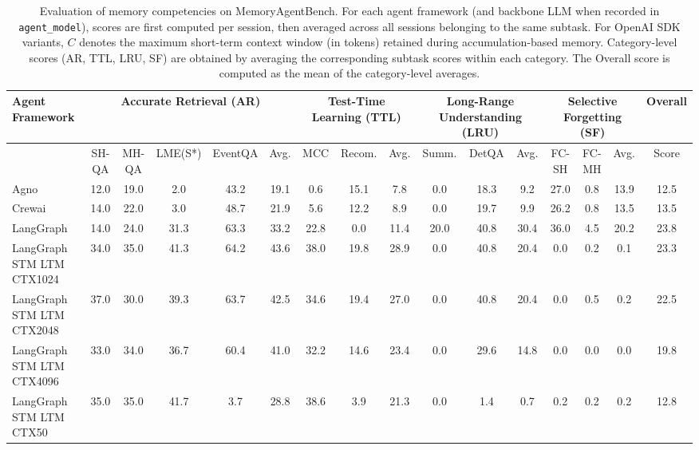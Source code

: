 \setlength{\tabcolsep}{2pt}
\begin{table}[t]
\centering
\caption{Evaluation of memory competencies on MemoryAgentBench.
For each agent framework (and backbone LLM when recorded in \texttt{agent\_model}), scores are first computed per session, then averaged across all sessions belonging to the same subtask.
For OpenAI SDK variants, $C$ denotes the maximum short-term context window (in tokens) retained during accumulation-based memory.
Category-level scores (AR, TTL, LRU, SF) are obtained by averaging the corresponding subtask scores within each category.
The Overall score is computed as the mean of the category-level averages.
}
\label{tab:memorybench-results}
\footnotesize
\begin{tabular}{
    l|
    *{5}{c}|  %
    *{3}{c}|  %
    *{3}{c}|  %
    *{3}{c}|  %
    c         %
}
\toprule
\textbf{Agent Framework} &
\multicolumn{5}{c|}{\textbf{Accurate Retrieval (AR)}} &
\multicolumn{3}{c|}{\textbf{Test-Time Learning (TTL)}} &
\multicolumn{3}{c|}{\textbf{Long-Range Understanding (LRU)}} &
\multicolumn{3}{c|}{\textbf{Selective Forgetting (SF)}} &
\textbf{Overall} \\
\midrule
& SH-QA & MH-QA & LME(S*) & EventQA & Avg. &
  MCC & Recom. & Avg. &
  Summ. & DetQA & Avg. &
  FC-SH & FC-MH & Avg. &
  Score \\
\midrule
Agno & 12.0 & 19.0 & 2.0 & 43.2 & 19.1 & 0.6 & 15.1 & 7.8 & 0.0 & 18.3 & 9.2 & 27.0 & 0.8 & 13.9 & 12.5 \\
Crewai & 14.0 & 22.0 & 3.0 & 48.7 & 21.9 & 5.6 & 12.2 & 8.9 & 0.0 & 19.7 & 9.9 & 26.2 & 0.8 & 13.5 & 13.5 \\
LangGraph & 14.0 & 24.0 & 31.3 & 63.3 & 33.2 & 22.8 & 0.0 & 11.4 & 20.0 & 40.8 & 30.4 & 36.0 & 4.5 & 20.2 & 23.8 \\
LangGraph STM LTM CTX1024 & 34.0 & 35.0 & 41.3 & 64.2 & 43.6 & 38.0 & 19.8 & 28.9 & 0.0 & 40.8 & 20.4 & 0.0 & 0.2 & 0.1 & 23.3 \\
LangGraph STM LTM CTX2048 & 37.0 & 30.0 & 39.3 & 63.7 & 42.5 & 34.6 & 19.4 & 27.0 & 0.0 & 40.8 & 20.4 & 0.0 & 0.5 & 0.2 & 22.5 \\
LangGraph STM LTM CTX4096 & 33.0 & 34.0 & 36.7 & 60.4 & 41.0 & 32.2 & 14.6 & 23.4 & 0.0 & 29.6 & 14.8 & 0.0 & 0.0 & 0.0 & 19.8 \\
LangGraph STM LTM CTX50 & 35.0 & 35.0 & 41.7 & 3.7 & 28.8 & 38.6 & 3.9 & 21.3 & 0.0 & 1.4 & 0.7 & 0.2 & 0.2 & 0.2 & 12.8 \\

\end{tabular}
\end{table}
